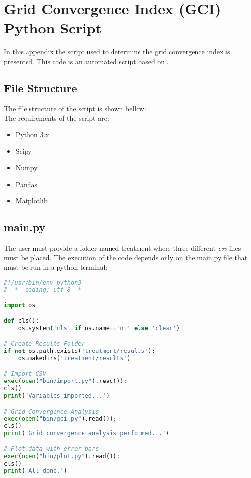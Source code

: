 \chapter{Grid Convergence Index (GCI) Python Script}
\label{chap:appendixA}
\noindent
In this appendix the script used to determine the grid convergence index is presented. This code is an automated script based on \textcite{celik2008}.
\section{File Structure}
\noindent
The file structure of the script is shown bellow:
\\
\noindent
The requirements of the script are:
\begin{itemize}
\item Python 3.x
\item Scipy
\item Numpy
\item Pandas
\item Matplotlib
\end{itemize}
\section{main.py}
The user must provide a folder named treatment where three different \textit{csv} files must be placed. The execution of the code depends only on the main.py file that must be run in a python terminal:

\begin{lstlisting}[language=python]
#!/usr/bin/env python3
# -*- coding: utf-8 -*-

import os

def cls():
    os.system('cls' if os.name=='nt' else 'clear')

# Create Results Folder
if not os.path.exists('treatment/results'):
    os.makedirs('treatment/results')

# Import CSV
exec(open("bin/import.py").read());
cls()
print('Variables imported...')

# Grid Convergence Analysis
exec(open("bin/gci.py").read());
cls()
print('Grid convergence analysis performed...')

# Plot data with error bars
exec(open("bin/plot.py").read());
cls()
print('All done.')
\end{lstlisting}
